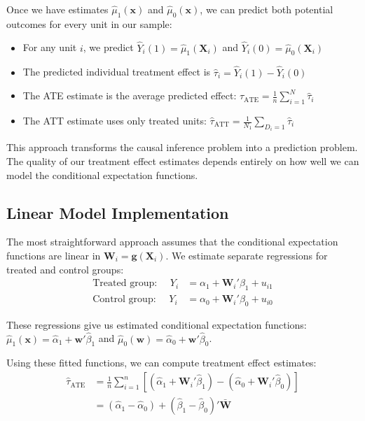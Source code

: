 \documentclass[12pt]{article}
\begin{document}
\begin{multicols}{2}
Once we have estimates $\hat{\mu}_1(\bm{x})$ and $\hat{\mu}_0(\bm{x})$, we can predict both potential outcomes for every unit in our sample:
\begin{itemize}
  \item For any unit $i$, we predict $\hat{Y}_i(1) = \hat{\mu}_1(\bm{X}_i)$ and $\hat{Y}_i(0) = \hat{\mu}_0(\bm{X}_i)$
  \item The predicted individual treatment effect is $\hat{\tau}_i = \hat{Y}_i(1) - \hat{Y}_i(0)$  
  \item The ATE estimate is the average predicted effect: $\hat{\tau}_{\text{ATE}} = \frac{1}{n}\sum_{i=1}^N \hat{\tau}_i$
  \item The ATT estimate uses only treated units: $\hat{\tau}_{\text{ATT}} = \frac{1}{N_1}\sum_{D_i=1} \hat{\tau}_i$
\end{itemize}

This approach transforms the causal inference problem into a prediction problem.
The quality of our treatment effect estimates depends entirely on how well we can model the conditional expectation functions.

\subsection*{Linear Model Implementation}

The most straightforward approach assumes that the conditional expectation functions are linear in $\bm{W}_i = \bm{g}(\bm{X}_i)$.
We estimate separate regressions for treated and control groups:
\begin{align*}
\text{Treated group: } \quad Y_i &= \alpha_1 + \bm{W}_i'\beta_1 + u_{i1} \\
\text{Control group: } \quad Y_i &= \alpha_0 + \bm{W}_i'\beta_0 + u_{i0}
\end{align*}

These regressions give us estimated conditional expectation functions:
$\hat{\mu}_1(\bm{x}) = \hat{\alpha}_1 + \bm{w}'\hat{\beta}_1$ and $\hat{\mu}_0(\bm{w}) = \hat{\alpha}_0 + \bm{w}'\hat{\beta}_0$.

Using these fitted functions, we can compute treatment effect estimates:
\begin{align*}
\hat{\tau}_{\text{ATE}} 
&= \frac{1}{n} \sum_{i=1}^n [(\hat{\alpha}_1 + \bm{W}_i'\hat{\beta}_1) - (\hat{\alpha}_0 + \bm{W}_i'\hat{\beta}_0)] \\
&= (\hat{\alpha}_1 - \hat{\alpha}_0) + (\hat{\beta}_1 - \hat{\beta}_0)'\bar{\bm{W}}
\end{align*}


\end{multicols}
\end{document}

